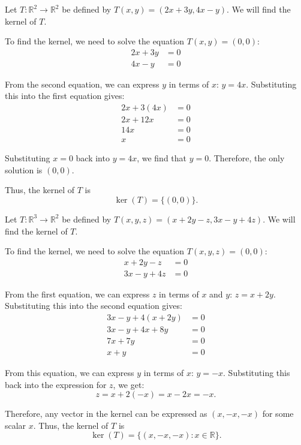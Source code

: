 \begin{example}\label{L1-ex:ker1}
    Let $T: \mathbb{R}^2 \to \mathbb{R}^2$ be defined by $T(x, y) = (2x + 3y, 4x - y)$. We will find the kernel of $T$.

    To find the kernel, we need to solve the equation $T(x, y) = (0, 0)$:
    \begin{align*}
        2x + 3y &= 0 \\
        4x - y &= 0
    \end{align*}

    From the second equation, we can express $y$ in terms of $x$: $y = 4x$. Substituting this into the first equation gives:
    \begin{align*}
        2x + 3(4x) &= 0 \\
        2x + 12x &= 0 \\
        14x &= 0 \\
        x &= 0
    \end{align*}

    Substituting $x = 0$ back into $y = 4x$, we find that $y = 0$. Therefore, the only solution is $(0, 0)$.

    Thus, the kernel of $T$ is
    \[\ker(T) = \{(0, 0)\}.\]
\end{example}

\begin{example}\label{L1-ex:ker2}
    Let $T: \mathbb{R}^3 \to \mathbb{R}^2$ be defined by $T(x, y, z) = (x + 2y - z, 3x - y + 4z)$. We will find the kernel of $T$.

    To find the kernel, we need to solve the equation $T(x, y, z) = (0, 0)$:
    \begin{align*}
        x + 2y - z &= 0 \\
        3x - y + 4z &= 0
    \end{align*}

    From the first equation, we can express $z$ in terms of $x$ and $y$: $z = x + 2y$. Substituting this into the second equation gives:
    \begin{align*}
        3x - y + 4(x + 2y) &= 0 \\
        3x - y + 4x + 8y &= 0 \\
        7x + 7y &= 0 \\
        x + y &= 0
    \end{align*}

    From this equation, we can express $y$ in terms of $x$: $y = -x$. Substituting this back into the expression for $z$, we get:
    \[z = x + 2(-x) = x - 2x = -x.\]

    Therefore, any vector in the kernel can be expressed as $(x, -x, -x)$ for some scalar $x$. Thus, the kernel of $T$ is
    \[\ker(T) = \{(x, -x, -x) : x \in \mathbb{R}\}.\]
\end{example}

